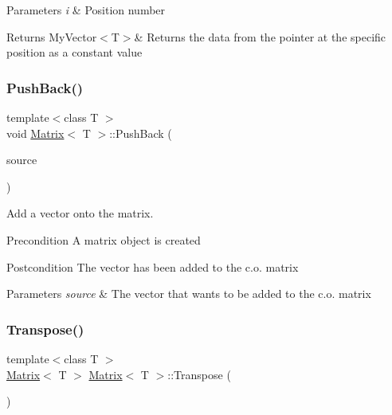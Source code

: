 \begin{DoxyParams}{Parameters}
{\em i} & Position number \\
\hline
\end{DoxyParams}
\begin{DoxyReturn}{Returns}
My\+Vector$<$\+T$>$\& Returns the data from the pointer at the specific position as a constant value 
\end{DoxyReturn}
\mbox{\label{class_matrix_af61aaa671b6bd354b27fb3aabbb65a9d}} 
\subsubsection{\texorpdfstring{PushBack()}{PushBack()}}
{\footnotesize\ttfamily template$<$class T $>$ \\
void \mbox{\hyperlink{class_matrix}{Matrix}}$<$ T $>$\+::Push\+Back (\begin{DoxyParamCaption}\item[{const \mbox{\hyperlink{class_my_vector}{My\+Vector}}$<$ T $>$ \&}]{source }\end{DoxyParamCaption})}



Add a vector onto the matrix. 

\begin{DoxyPrecond}{Precondition}
A matrix object is created 
\end{DoxyPrecond}
\begin{DoxyPostcond}{Postcondition}
The vector has been added to the c.\+o. matrix
\end{DoxyPostcond}

\begin{DoxyParams}{Parameters}
{\em source} & The vector that wants to be added to the c.\+o. matrix \\
\hline
\end{DoxyParams}
\mbox{\label{class_matrix_a86d55a5db43b641f4e8fb2b302ccc599}} 
\subsubsection{\texorpdfstring{Transpose()}{Transpose()}}
{\footnotesize\ttfamily template$<$class T $>$ \\
\mbox{\hyperlink{class_matrix}{Matrix}}$<$ T $>$ \mbox{\hyperlink{class_matrix}{Matrix}}$<$ T $>$\+::Transpose (\begin{DoxyParamCaption}{ }\end{DoxyParamCaption})}



